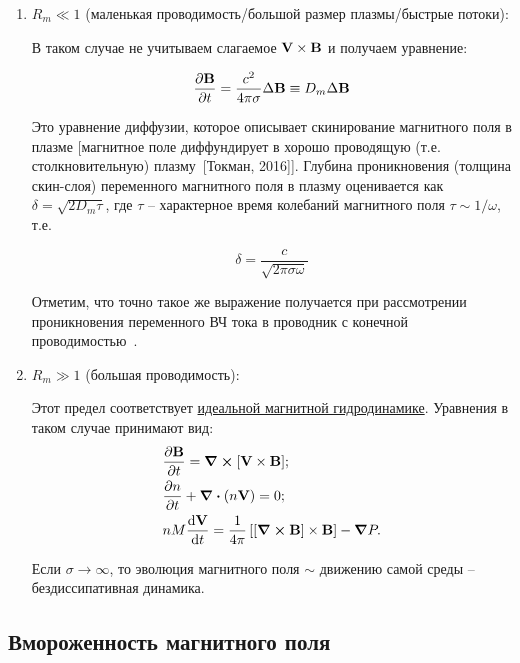 \documentclass[10pt, a4paper]{article}
\newcommand{\Tokman}{~[Токман, 2016]}
\begin{document}
\begin{enumerate}
	
	\item $R_m \ll 1$ (маленькая проводимость/большой размер плазмы/быстрые потоки):
	
	В таком случае не учитываем слагаемое $\vb{V}\times\vb{B}$ и получаем уравнение:
	
	\begin{equation*}
		\pdv{\vb{B}}{t} = \frac{c^2}{4\pi\sigma}\Delta\vb{B} \equiv D_m\Delta\vb{B}
	\end{equation*}

	Это уравнение диффузии, которое описывает скинирование магнитного поля в плазме [магнитное поле диффундирует в хорошо проводящую (т.е. столкновительную) плазму\Tokman].
	Глубина проникновения (толщина скин-слоя) переменного магнитного поля в плазму оценивается как $\delta = \sqrt{2D_m\tau}$, где $\tau$ -- характерное время колебаний магнитного поля $\tau\sim 1/\omega$, т.е.
	
	\begin{equation*}
		\delta = \frac{c}{\sqrt{2\pi\sigma\omega}}
	\end{equation*}

	Отметим, что точно такое же выражение получается при рассмотрении проникновения переменного ВЧ тока в проводник с конечной проводимостью~\cite{kotelnikov}.
		
	\item $R_m \gg 1$ (большая проводимость):
	
	Этот предел соответствует \uline{идеальной магнитной гидродинамике}. Уравнения в таком случае принимают вид:
	\begin{align}
		\label{eq:iMHD_B} &\pdv{\vb{B}}{t} = \curl{[\vb{V}\times\vb{B}]}; \\
		&\pdv{n}{t} + \divergence{\left( n\vb{V} \right)} = 0;\\
		\label{eq:iMHD_motion} &n M \dv{\vb{V}}{t} = \frac{1}{4\pi}\left[\left[\curl{\vb{B}} \right]\times\vb{B}\right]-\grad{P}.
	\end{align}

	Если $\sigma\rightarrow\infty$, то эволюция магнитного поля $\sim$ движению самой среды -- бездиссипативная динамика.
	
\end{enumerate}

\subsection{Вмороженность магнитного поля} \label{subsec:Alfven_th}
\end{document}
